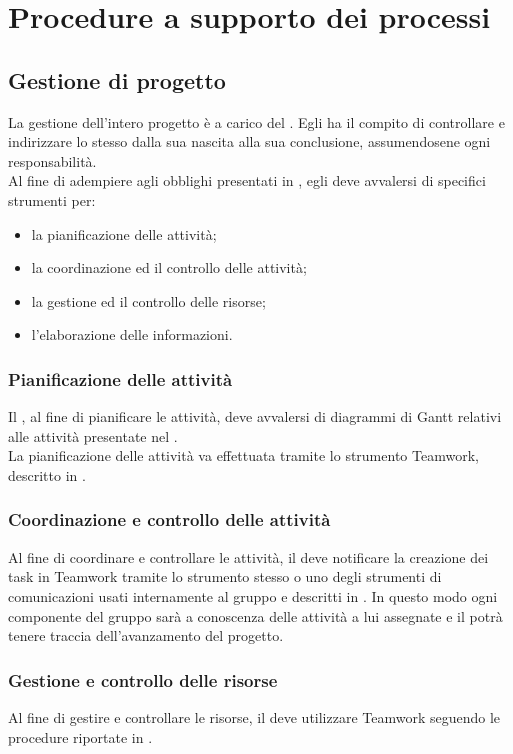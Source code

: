 \section{Procedure a supporto dei processi}
\subsection{Gestione di progetto}
La gestione dell'intero progetto è a carico del \Responsabile. Egli ha il compito di controllare e indirizzare lo stesso dalla sua nascita alla sua conclusione, assumendosene ogni responsabilità.\\
Al fine di adempiere agli obblighi presentati in , egli deve avvalersi di specifici strumenti per:
\begin{itemize}
	\item la pianificazione delle attività;
	\item la coordinazione ed il controllo delle attività;
	\item la gestione ed il controllo delle risorse;
	\item l'elaborazione delle informazioni.
\end{itemize}

\subsubsection{Pianificazione delle attività}
Il \Responsabile, al fine di pianificare le attività, deve avvalersi di diagrammi di Gantt relativi alle attività presentate nel \PianoDiProgetto.\\
La pianificazione delle attività va effettuata tramite lo strumento Teamwork, descritto in .

\subsubsection{Coordinazione e controllo delle attività}
Al fine di coordinare e controllare le attività, il \Responsabile{} deve notificare la creazione dei task in Teamwork tramite lo strumento stesso o uno degli strumenti di comunicazioni usati internamente al gruppo e descritti in . In questo modo ogni componente del gruppo sarà a conoscenza delle attività a lui assegnate e il \Responsabile{} potrà tenere traccia dell'avanzamento del progetto.

\subsubsection{Gestione e controllo delle risorse}
Al fine di gestire e controllare le risorse, il \Responsabile{} deve utilizzare Teamwork seguendo le procedure riportate in .

